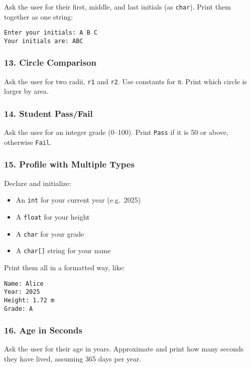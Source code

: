 \documentclass[
  letterpaper,
  DIV=11,
  numbers=noendperiod]{scrreprt}
\providecommand{\tightlist}{%
  \setlength{\itemsep}{0pt}\setlength{\parskip}{0pt}}
\begin{document}
Ask the user for their first, middle, and last initials (as
\texttt{char}). Print them together as one string:

\begin{verbatim}
Enter your initials: A B C
Your initials are: ABC
\end{verbatim}

\subsubsection{13. Circle Comparison}\label{circle-comparison}

Ask the user for two radii, \texttt{r1} and \texttt{r2}. Use constants
for π. Print which circle is larger by area.

\subsubsection{14. Student Pass/Fail}\label{student-passfail}

Ask the user for an integer grade (0--100). Print \texttt{Pass} if it is
50 or above, otherwise \texttt{Fail}.

\subsubsection{15. Profile with Multiple
Types}\label{profile-with-multiple-types}

Declare and initialize:

\begin{itemize}
\tightlist
\item
  An \texttt{int} for your current year (e.g.~2025)
\item
  A \texttt{float} for your height
\item
  A \texttt{char} for your grade
\item
  A \texttt{char{[}{]}} string for your name
\end{itemize}

Print them all in a formatted way, like:

\begin{verbatim}
Name: Alice
Year: 2025
Height: 1.72 m
Grade: A
\end{verbatim}

\subsubsection{16. Age in Seconds}\label{age-in-seconds}

Ask the user for their age in years. Approximate and print how many
seconds they have lived, assuming 365 days per year.
\end{document}
